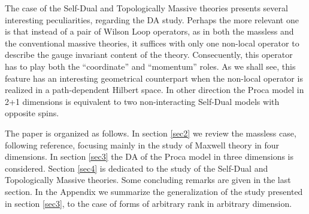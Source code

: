 \documentclass[a4paper,12pt]{article}
\begin{document}
The case of the Self-Dual  and Topologically Massive theories
presents several interesting peculiarities, regarding the DA
study. Perhaps the more relevant one is that instead of a pair of
Wilson Loop  operators, as in both the massless and the
conventional massive theories, it suffices with only one
non-local operator to describe the gauge invariant content of the
theory. Consecuently, this operator has to play both the
``coordinate'' and ``momentum'' roles. As we shall see, this
feature has an interesting geometrical counterpart when the
non-local operator is realized in a path-dependent Hilbert space. In other
direction the Proca model in 2+1 dimensions is equivalent to two non-interacting
Self-Dual models with opposite spins. 

The paper is organized as follows. In section \ref{sec2} we
review the massless case, following reference\cite{LL}, focusing
mainly in the study of Maxwell theory in four dimensions. In
section \ref{sec3} the DA of the Proca model in three dimensions
is considered. Section \ref{sec4} is dedicated to the study of the
Self-Dual and Topologically Massive theories. Some concluding
remarks are given in the last section. In the Appendix we
summarize the generalization of the study presented in section
\ref{sec3}, to the case of forms of arbitrary rank in arbitrary
dimension.
\end{document}
